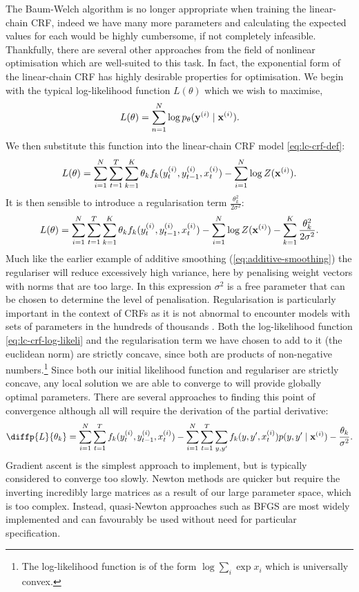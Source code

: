 \documentclass[../main.tex]{subfiles}
\begin{document}
The Baum-Welch algorithm is no longer appropriate when training the linear-chain CRF, indeed we have many more parameters and calculating the expected values for each would be highly cumbersome, if not completely infeasible.
Thankfully, there are several other approaches from the field of nonlinear optimisation which are well-suited to this task.
In fact, the exponential form of the linear-chain CRF has highly desirable properties for optimisation.
We begin with the typical log-likelihood function $L(\theta)$ which we wish to maximise,
\begin{equation*}
    L(\theta) = \sum_{n=1}^N \log p_\theta(\mathbf{y}^{(i)} \mid \mathbf{x}^{(i)}).
\end{equation*}
We then substitute this function into the linear-chain CRF model \cref{eq:lc-crf-def}:
\begin{equation} \label{eq:lc-crf-log-likeli}
        L(\theta) = \sum_{i=1}^N \sum_{t=1}^T \sum_{k=1}^K \theta_k f_k(y_t^{(i)}, y_{t-1}^{(i)}, x_t^{(i)}) - \sum_{i=1}^N \log Z(\mathbf{x}^{(i)}).
\end{equation}
It is then sensible to introduce a regularisation term $\frac{\theta_k^2}{2\sigma^2}$:
\begin{equation*}
        L(\theta) = \sum_{i=1}^N \sum_{t=1}^T \sum_{k=1}^K \theta_k f_k(y_t^{(i)}, y_{t-1}^{(i)}, x_t^{(i)}) - \sum_{i=1}^N \log Z(\mathbf{x}^{(i)}) - \sum_{k=1}^K \frac{\theta_k^2}{2\sigma^2}.
\end{equation*}
Much like the earlier example of additive smoothing (\cref{eq:additive-smoothing}) the regulariser will reduce excessively high variance, here by penalising weight vectors with norms that are too large. In this expression $\sigma^2$ is a free parameter that can be chosen to determine the level of penalisation.
Regularisation is particularly important in the context of CRFs as it is not abnormal to encounter models with sets of parameters in the hundreds of thousands \autocite{sutton-2012-crfintro}.
Both the log-likelihood function \cref{eq:lc-crf-log-likeli} and the regularisation term we have chosen to add to it (the euclidean norm) are strictly concave, since both are products of non-negative numbers.\footnote{The log-likelihood function is of the form $\log \sum_i \exp{x_i}$ which is universally convex.}
Since both our initial likelihood function and regulariser are strictly concave, any local solution we are able to converge to will provide globally optimal parameters.
There are several approaches to finding this point of convergence although all will require the derivation of the partial derivative:
\begin{equation*}
    \diffp{L}{{\theta_k}} = \sum_{i=1}^N  \sum_{t=1}^T f_k(y_t^{(i)}, y_{t-1}^{(i)}, x_t^{(i)}) - \sum_{i=1}^N \sum_{t=1}^T \sum_{y,y'} f_k(y,y',x_t^{(i)})p(y,y'\mid \boldX^{(i)}) - \frac{\theta_k}{\sigma^2}. 
\end{equation*}
Gradient ascent is the simplest approach to implement, but is typically considered to converge too slowly. Newton methods are quicker but require the inverting incredibly large matrices as a result of our large parameter space, which is too complex.
Instead, quasi-Newton approaches such as BFGS are most widely implemented and can favourably be used without need for particular specification.
\end{document}
